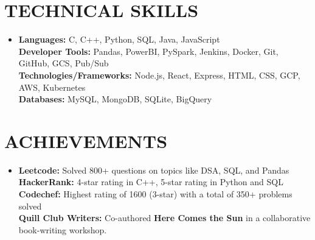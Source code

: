 \documentclass[letterpaper,11pt]{article}
\begin{document}
\section{TECHNICAL SKILLS}
\begin{itemize}[leftmargin=0.15in, label={}]
  \item{
        \textbf{Languages: }{C, C++, Python, SQL, Java, JavaScript} \\
        \textbf{Developer Tools: }{Pandas, PowerBI, PySpark, Jenkins, Docker, Git, GitHub, GCS, Pub/Sub} \\
        \textbf{Technologies/Frameworks: }{Node.js, React, Express, HTML, CSS, GCP, AWS, Kubernetes} } \\
        \textbf{Databases: }{MySQL, MongoDB, SQLite, BigQuery}
\end{itemize}
\vspace{-16pt}

\section{ACHIEVEMENTS}
\begin{itemize}[leftmargin=0.15in, label={}]

  \item
        \textbf{Leetcode:} Solved 800+ questions on topics like DSA, SQL, and Pandas \\
        \textbf{HackerRank:} 4-star rating in C++, 5-star rating in Python and SQL \\
        \textbf{Codechef:} Highest rating of 1600 (3-star) with a total of 350+ problems solved \\
        \textbf{Quill Club Writers:} Co-authored \textbf{Here Comes the Sun} in a collaborative book-writing workshop.
\end{itemize}
\end{document}
